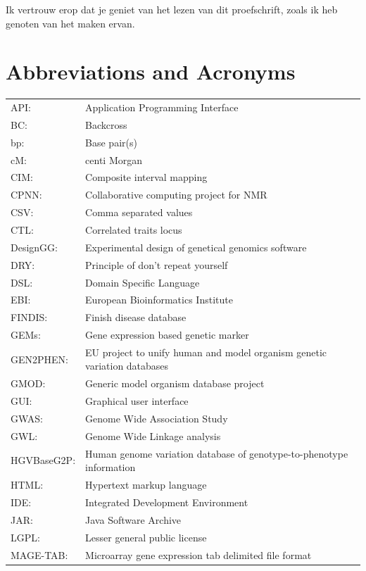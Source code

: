 Ik vertrouw erop dat je geniet van het lezen van dit proefschrift, zoals ik heb genoten van het maken 
ervan.

\newpage
\section{Abbreviations and Acronyms}
{\footnotesize
\begin{tabular}{ l l }
API:         & Application Programming Interface\\
BC:          & Backcross \\
bp:          & Base pair(s) \\
cM:          & centi Morgan \\
CIM:         & Composite interval mapping \\
CPNN:        & Collaborative computing project for NMR\\
CSV:         & Comma separated values\\
CTL:         & Correlated traits locus \\
DesignGG:    & Experimental design of genetical genomics software\\
DRY:         & Principle of don't repeat yourself\\
DSL:         & Domain Specific Language\\
EBI:         & European Bioinformatics Institute\\
FINDIS:      & Finish disease database\\
GEMs:        & Gene expression based genetic marker\\
GEN2PHEN:    & EU project to unify human and model organism genetic variation databases\\
GMOD:        & Generic model organism database project\\
GUI:         & Graphical user interface\\
GWAS:        & Genome Wide Association Study\\
GWL:         & Genome Wide Linkage analysis\\
HGVBaseG2P:  & Human genome variation database of genotype-to-phenotype information\\
HTML:        & Hypertext markup language\\
IDE:         & Integrated Development Environment\\
JAR:         & Java Software Archive\\
LGPL:        & Lesser general public license\\
MAGE-TAB:    & Microarray gene expression tab delimited file format\\

\end{tabular}}
